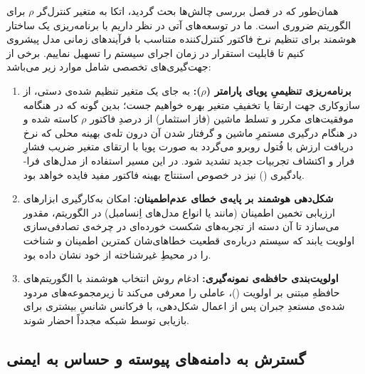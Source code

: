 \documentclass[oneside,openany,phd]{TMU-Thesis}
\begin{document}
همان‌طور که در فصل بررسی چالش‌ها بحث گردید، اتکا به متغیر کنترل‌گر $\rho$ برای الگوریتم ضروری است. ما در توسعه‌های آتی در نظر داریم با برنامه‌ریزی یک ساختار هوشمند برای تنظیم نرخ فاکتور کنترل‌کننده متناسب با فرآیندهای زمانی مدل پیشروی کنیم تا قابلیت استقرار در زمان اجرای سیستم را تسهیل نماییم. برخی از جهت‌گیری‌های تخصصی شامل موارد زیر می‌باشد:
\begin{enumerate}
    \item \textbf{برنامه‌ریزی تنظیمیِ پویای پارامتر ($\rho$):} به جای یک متغیر تنظیم شده‌ی دستی، از سازوکاری جهت ارتقا یا تخفیفِ متغیر بهره خواهیم جست؛ بدین گونه که در هنگامه موفقیت‌های مکرر و تسلط ماشین (فاز استثمار) از درصدِ فاکتور $\rho$ کاسته شده و در هنگام درگیری مستمرِ ماشین و گرفتار شدن آن درون تله‌ی بهینه محلی که نرخ دریافت ارزش با فُتول روبرو می‌گردد به صورت پویا با ارتقای متغیر ضریب فشارِ فرار و اکتشاف تجربیات جدید تشدید شود. در این مسیر استفاده از مدل‌های فرا-یادگیری () نیز در خصوص استنتاج بهینه فاکتور مفید فایده خواهد بود.
    \item \textbf{شکل‌دهی هوشمند بر پایه‌ی خطای عدم‌اطمینان:} امکان به‌کارگیری ابزارهای ارزیابی تخمین اطمینان (مانند  یا انواع مدل‌های اِنسامبل) در الگوریتم، مقدور می‌سازد تا آن دسته از تجربه‌های شکست خورده‌ای در چرخه‌ی تصادفی‌سازی اولویت یابند که سیستم درباره‌ی قطعیت خطاهای‌شان کمترین اطمینان و شناخت را در محیطِ غیرشناخته از خود نشان داده بود.
    \item \textbf{اولویت‌بندی حافظه‌ی نمونه‌گیری:} ادغام روش انتخاب هوشمند با الگوریتم‌های حافظهِ مبتنی بر اولویت ()، عاملی را معرفی می‌کند تا زیرمجموعه‌های مردود شده‌ی مستعدِ جبران پس از اعمال شکل‌دهی، با فرکانس شانسِ بیشتری برای بازیابی توسط شبکه مجدداً احضار شوند.
\end{enumerate}

\subsection{گسترش به دامنه‌های پیوسته و حساس به ایمنی}
\end{document}
